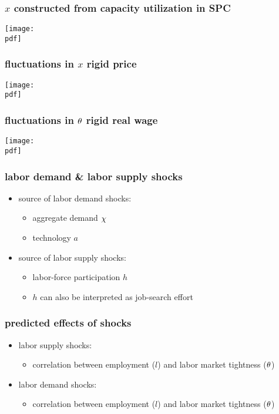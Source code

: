 \documentclass[12pt,xcolor={dvipsnames},hyperref={pdftex,pdfpagemode=UseNone,hidelinks,pdfdisplaydoctitle=true},usepdftitle=false]{beamer}
\def\pdf{xad.pdf}
\begin{document}
\begin{frame}
\end{frame}

\begin{frame}
\frametitle{$x$ constructed from capacity utilization in SPC}
\texttt{[image: \\pdf]}%
\end{frame}


\begin{frame}
\frametitle{fluctuations in $x$ \so rigid price}
\texttt{[image: \\pdf]}%
\end{frame}


\begin{frame}
\frametitle{fluctuations in $\theta$ \so rigid real wage}
\texttt{[image: \\pdf]}%
\end{frame}

\begin{frame}
\end{frame}

\begin{frame}
\frametitle{labor demand \& labor supply shocks}
\begin{itemize}
\item source of labor demand shocks:
\begin{itemize}
\item aggregate demand $\chi$
\item technology $a$
\end{itemize}
\item source of labor supply shocks:
\begin{itemize}
\item labor-force participation $h$
\item $h$ can also be interpreted as job-search effort
\end{itemize}
\end{itemize}
\end{frame}


\begin{frame}
\frametitle{predicted effects of shocks}
\begin{itemize}
\item labor supply shocks: 
\begin{itemize}
\item {} correlation between employment ($l$) and labor market tightness ($\theta$)
\end{itemize}
\item labor demand shocks:
\begin{itemize}
\item {} correlation between employment ($l$) and labor market tightness ($\theta$)
\end{itemize}
\end{itemize}
\end{frame}
\end{document}
